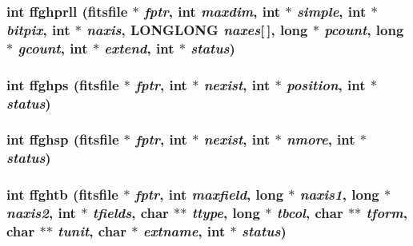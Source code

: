 \subsubsection{\setlength{\rightskip}{0pt plus 5cm}int ffghprll (\bf{fitsfile} $\ast$ {\em fptr}, int {\em maxdim}, int $\ast$ {\em simple}, int $\ast$ {\em bitpix}, int $\ast$ {\em naxis}, \bf{LONGLONG} {\em naxes}[$\,$], long $\ast$ {\em pcount}, long $\ast$ {\em gcount}, int $\ast$ {\em extend}, int $\ast$ {\em status})}\label{test_2shm__client_2fitsio_8h_0d54065b1609c1b7edcbe08454996773}


\subsubsection{\setlength{\rightskip}{0pt plus 5cm}int ffghps (\bf{fitsfile} $\ast$ {\em fptr}, int $\ast$ {\em nexist}, int $\ast$ {\em position}, int $\ast$ {\em status})}\label{test_2shm__client_2fitsio_8h_5bc2324399a2cc4c0cf179c6af73c253}


\subsubsection{\setlength{\rightskip}{0pt plus 5cm}int ffghsp (\bf{fitsfile} $\ast$ {\em fptr}, int $\ast$ {\em nexist}, int $\ast$ {\em nmore}, int $\ast$ {\em status})}\label{test_2shm__client_2fitsio_8h_72d53ce1ae759524a27f68fc55dbc9ab}


\subsubsection{\setlength{\rightskip}{0pt plus 5cm}int ffghtb (\bf{fitsfile} $\ast$ {\em fptr}, int {\em maxfield}, long $\ast$ {\em naxis1}, long $\ast$ {\em naxis2}, int $\ast$ {\em tfields}, char $\ast$$\ast$ {\em ttype}, long $\ast$ {\em tbcol}, char $\ast$$\ast$ {\em tform}, char $\ast$$\ast$ {\em tunit}, char $\ast$ {\em extname}, int $\ast$ {\em status})}\label{test_2shm__client_2fitsio_8h_31a49b3fe1b2a1e589794d420e2082fb}



